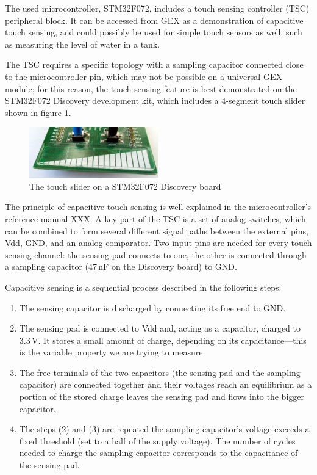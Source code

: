 The used microcontroller, STM32F072, includes a touch sensing controller (TSC) peripheral block. It can be accessed from GEX as a demonstration of capacitive touch sensing, and could possibly be used for simple touch sensors as well, such as measuring the level of water in a tank.

The TSC requires a specific topology with a sampling capacitor connected close to the microcontroller pin, which may not be possible on a universal GEX module; for this reason, the touch sensing feature is best demonstrated on the STM32F072 Discovery development kit, which includes a 4-segment touch slider shown in figure \ref{fig:disco-touch}.

\begin{figure}
	\centering
	\includegraphics[width=0.5\textwidth] {img/disco-touch.jpg}
	\caption{\label{fig:disco-touch}The touch slider on a STM32F072 Discovery board}
\end{figure}

The principle of capacitive touch sensing is well explained in the microcontroller's reference manual XXX. A key part of the TSC is a set of analog switches, which can be combined to form several different signal paths between the external pins, Vdd, GND, and an analog comparator. Two input pins are needed for every touch sensing channel: the sensing pad connects to one, the other is connected through a sampling capacitor  (47\,nF on the Discovery board) to GND. 

Capacitive sensing is a sequential process described in the following steps:

\begin{enumerate}
	\item The sensing capacitor is discharged by connecting its free end to GND.
	\item The sensing pad is connected to Vdd and, acting as a capacitor, charged to 3.3\,V. It stores a small amount of charge, depending on its capacitance---this is the variable property we are trying to measure.
	\item The free terminals of the two capacitors (the sensing pad and the sampling capacitor) are connected together and their voltages reach an equilibrium as a portion of the stored charge leaves the sensing pad and flows into the bigger capacitor.
	\item The steps (2) and (3) are repeated the sampling capacitor's voltage exceeds a fixed threshold (set to a half of the supply voltage). The number of cycles needed to charge the sampling capacitor corresponds to the capacitance of the sensing pad.
\end{enumerate}

